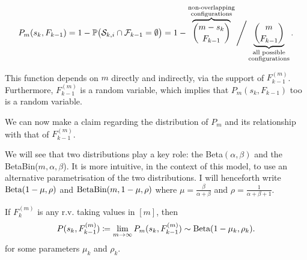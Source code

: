 \documentclass[../../main.tex]{subfiles}
\begin{document}
\begin{equation}
  P_m(s_k, F_{k-1}) = 1 - \P\big( \mathcal{S}_{k, i} \cap \mathcal{F}_{k - 1} = \emptyset \big) =  1 - \overbrace{\binom{m - s_k}{F_{k-1}}}^{\substack{\text{non-overlapping} \\ \text{configurations}}} \Bigg/ \underbrace{\binom{m}{F_{k-1}}}_{\substack{\text{all possible} \\ \text{configurations}}}. 
\end{equation}

This function depends on $m$ directly and indirectly, via the support of $F^{(m)}_{k-1}$. Furthermore, $F^{(m)}_{k - 1}$ is a random variable, which implies that $P_m(s_k, F_{k-1})$ too is a random variable. 

We can now make a claim regarding the distribution of $P_m$ and its relationship with that of $F^{(m)}_{k - 1}$. 

We will see that two distributions play a key role: the Beta$(\alpha, \beta)$ and the BetaBin($m, \alpha, \beta$). It is more intuitive, in the context of this model, to use an alternative parametrisation of the two distributions. I will henceforth write $\Beta(1 - \mu, \rho)$ and $\Beta\Bin(m, 1 - \mu, \rho)$ where $\mu = \frac{\beta}{\alpha + \beta}$ and $\rho = \frac{1}{\alpha + \beta + 1}$.

\begin{lemma} \label{lemma:Ftop}
  If $F^{(m)}_k$ is any r.v. taking values in $[m]$, then \begin{equation*}P(s_k, F^{(m)}_{k - 1}) \coloneqq \lim_{m \rightarrow \infty} P_m(s_k, F^{(m)}_{k - 1}) \sim \Beta(1 - \mu_k, \rho_k).\end{equation*} for some parameters $\mu_k$ and $\rho_k$.
\end{lemma}
\end{document}
